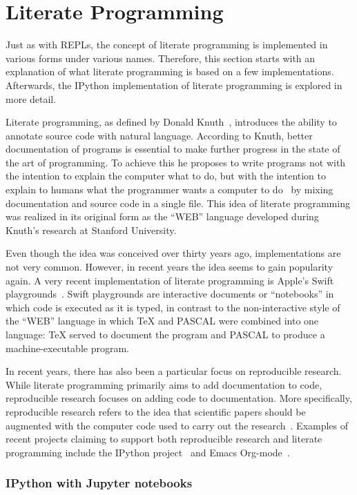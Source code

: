 \section{Literate Programming}
\label{sec:literate-programming}

Just as with REPLs, the concept of literate programming is implemented in
various forms under various names. Therefore, this section starts with an
explanation of what literate programming is based on a few implementations.
Afterwards, the IPython implementation of literate programming is explored in more
detail.

Literate programming, as defined by Donald Knuth~\cite{knuth1984}, introduces
the ability to annotate source code with natural language. According to Knuth,
better documentation of programs is essential to make further progress in the
state of the art of programming.  To achieve this he proposes to write programs
not with the intention to explain the computer what to do, but with the
intention to explain to humans what the programmer wants a computer to
do~\cite{knuth1984} by mixing documentation and source code in a single file.
This idea of literate programming was realized in its original form as the
``WEB'' language developed during Knuth's research at Stanford University.

Even though the idea was conceived over thirty years ago, implementations are not
very common. However, in recent years the idea seems to gain popularity again.
A very recent implementation of literate programming is Apple's Swift
playgrounds~\cite{swift-playgrounds}. Swift playgrounds are interactive
documents or ``notebooks'' in which code is executed as it is typed, in
contrast to the non-interactive style of the ``WEB'' language in which \TeX{} and
PASCAL were combined into one language: \TeX{} served to document the program
and PASCAL to produce a machine-executable program.

In recent years, there has also been a particular focus on reproducible
research. While literate programming primarily aims to add documentation to
code, reproducible research focuses on adding code to documentation. More
specifically, reproducible research refers to the idea that scientific papers
should be augmented with the computer code used to carry out the
research~\cite{schulte2012}. Examples of recent projects claiming to support
both reproducible research and literate programming include the IPython
project~\cite{ipython2007} and Emacs Org-mode~\cite{schulte2012}.

\subsubsection{IPython with Jupyter notebooks}

